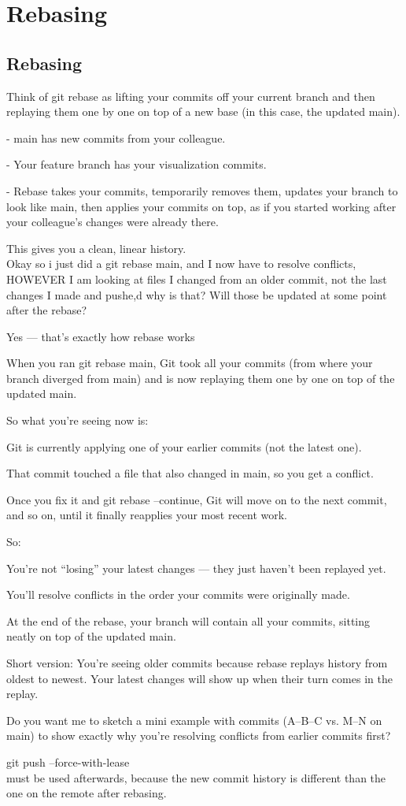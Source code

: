 \chapter{Rebasing}
\section{Rebasing}
Think of git rebase as lifting your commits off your current branch and then replaying them one by one on top of a new base (in this case, the updated main).

- main has new commits from your colleague.

- Your feature branch has your visualization commits.

- Rebase takes your commits, temporarily removes them, updates your branch to look like main, then applies your commits on top, as if you started working after your colleague’s changes were already there.

This gives you a clean, linear history.\\

Okay so i just did a git rebase main, and I now have to resolve conflicts, HOWEVER I am looking at files I changed from an older commit, not the last changes I made and pushe,d why is that? Will those be updated at some point after the rebase?

Yes — that’s exactly how rebase works 

When you ran git rebase main, Git took all your commits (from where your branch diverged from main) and is now replaying them one by one on top of the updated main.

So what you’re seeing now is:

Git is currently applying one of your earlier commits (not the latest one).

That commit touched a file that also changed in main, so you get a conflict.

Once you fix it and git rebase --continue, Git will move on to the next commit, and so on, until it finally reapplies your most recent work.

So:

You’re not “losing” your latest changes — they just haven’t been replayed yet.

You’ll resolve conflicts in the order your commits were originally made.

At the end of the rebase, your branch will contain all your commits, sitting neatly on top of the updated main.

Short version: You’re seeing older commits because rebase replays history from oldest to newest. Your latest changes will show up when their turn comes in the replay.

Do you want me to sketch a mini example with commits (A–B–C vs. M–N on main) to show exactly why you’re resolving conflicts from earlier commits first?

git push --force-with-lease\\
must be used afterwards, because the new commit history is different than the one on the remote after rebasing.